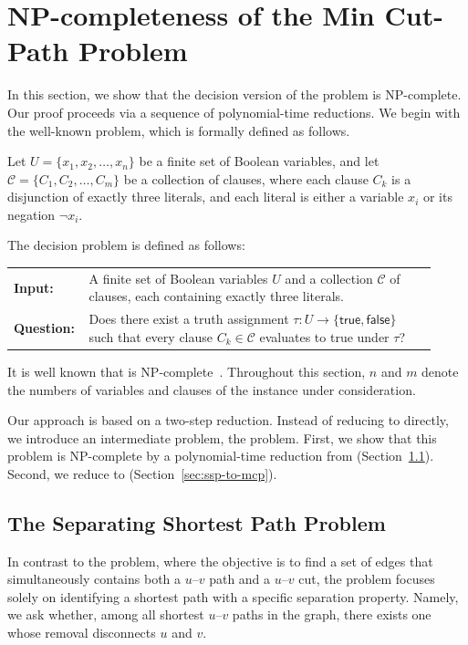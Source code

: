 \section{NP-completeness of the Min Cut-Path Problem}
\label{sec:np-completeness}
In this section, we show that the decision version of the \MinCutPath{} problem is NP-complete.
Our proof proceeds via a sequence of polynomial-time reductions.
We begin with the well-known \ThreeSAT{} problem, which is formally defined as follows.





\begin{problem}[\ThreeSAT]
Let $U = \{x_1, x_2, \dots, x_n\}$ be a finite set of Boolean variables, and let
$\mathcal{C} = \{C_1, C_2, \dots, C_m\}$ be a collection of clauses, where each clause
$C_k$ is a disjunction of exactly three literals, and each literal is either a variable $x_i$ or its negation $\neg x_i$.

The \ThreeSAT{} decision problem is defined as follows:

\begin{center}
\begin{tabular}{p{0.12\linewidth}p{0.8\linewidth}}
\textbf{Input:} & A finite set of Boolean variables $U$ and a collection $\mathcal{C}$ of clauses, each containing exactly three literals.\\
\textbf{Question:} & Does there exist a truth assignment $\tau: U \rightarrow \{\mathsf{true}, \mathsf{false}\}$ such that every clause $C_k \in \mathcal{C}$ evaluates to \textsf{true} under $\tau$?
\end{tabular}
\end{center}
\end{problem}


It is well known that \ThreeSAT{} is NP-complete~\cite{Cook1971Complexity}.
Throughout this section, $n$ and $m$ denote the numbers of variables and clauses of the \ThreeSAT{} instance under consideration.

Our approach is based on a two-step reduction.
Instead of reducing \ThreeSAT{} to \MinCutPath{} directly, we introduce an intermediate problem, the \SSP{} problem.
First, we show that this problem is NP-complete by a polynomial-time reduction from \ThreeSAT{} (Section~\ref{sec:ssp}).
Second, we reduce \SSP{} to \MinCutPath{} (Section~\ref{sec:ssp-to-mcp}).


\subsection{The Separating Shortest Path Problem}\label{sec:ssp}
In contrast to the \MinCutPath{} problem, where the objective is to find a set of edges that simultaneously contains both a $u$--$v$ path and a $u$--$v$ cut, the \SSP{} problem focuses solely on identifying a shortest path with a specific separation property.
Namely, we ask whether, among all shortest $u$--$v$ paths in the graph, there exists one whose removal disconnects $u$ and $v$.

